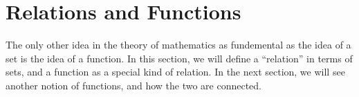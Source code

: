 \section{Relations and Functions}
The only other idea in the theory of mathematics as fundemental as the idea of a set is the idea of a function. In this section, we will define a ``relation'' in terms of sets, and a function as a special kind of relation. In the next section, we will see another notion of functions, and how the two are connected.

 
 
% 
 
 
 
 
 
 
 
 
 
 
